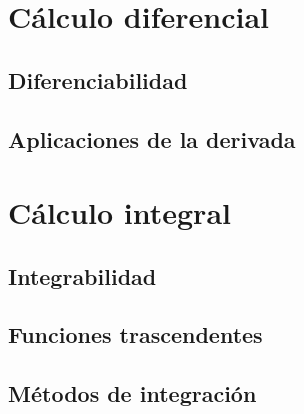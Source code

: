\part{Cálculo diferencial}
\chapter{Diferenciabilidad}






\chapter{Aplicaciones de la derivada}







\part{Cálculo integral}
\chapter{Integrabilidad}







\chapter{Funciones trascendentes}






\chapter{Métodos de integración}





